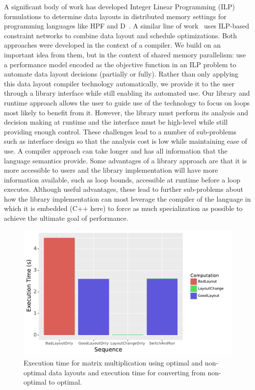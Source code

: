\documentclass{article}
\begin{document}
A significant body of work has developed Integer Linear Programming (ILP) formulations to determine data layouts in distributed memory settings for programming languages like HPF and D~\cite{bixby1994automatic,kennedy1995automatic,kennedy1998automatic}. 
A similar line of work~\cite{chen2004ilp,chen2005constraint,chen2005integrating, ozturk2011data} uses ILP-based constraint networks to combine data layout and schedule optimizations. 
Both approaches were developed in the context of a compiler. 
We build on an important idea from them, but in the context of shared memory parallelism: use a performance model encoded as the objective function in an ILP problem to automate data layout decisions (partially or fully).
Rather than only applying this data layout compiler technology automatically, we provide it to the user through a library interface while still enabling its automated use.
Our library and runtime approach allows the user to guide use of the technology to focus on loops most likely to benefit from it.
However, the library must perform its analysis and decision making at runtime and the interface must be high-level while still providing enough control. 
These challenges lead to a number of sub-problems such as interface design so that the analysis cost is low while maintaining ease of use.
A compiler approach can take longer and has all information that the language semantics provide.
Some advantages of a library approach are that it is more accessible to users and the library implementation will have more information available, such as loop bounds, accessible at runtime before a loop executes.
Although useful advantages, these lead to further sub-problems about how the library implementation can most leverage the compiler of the language in which it is embedded (C++ here) to force as much specialization as possible to achieve the ultimate goal of performance.
\begin{figure}
    \centering
	\includegraphics[width=0.5\columnwidth]{IntroExampleGraph.pdf}
	\caption{Execution time for matrix multiplication using optimal and non-optimal data layouts and execution time for converting from non-optimal to optimal.}
	\label{DataLayoutImportance}
\end{figure}
\end{document}
